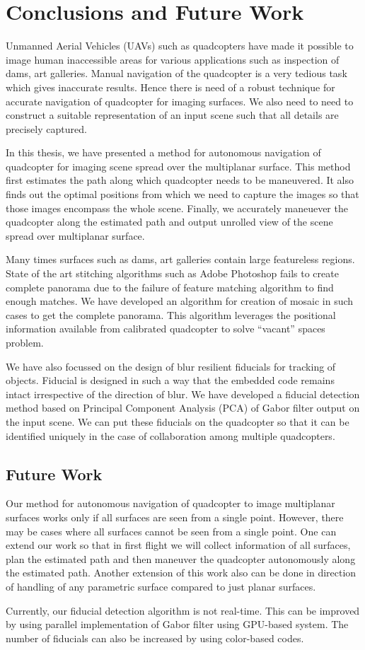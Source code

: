 \chapter{Conclusions and Future Work}
\label{sec:conclusion}
Unmanned Aerial Vehicles (UAVs) such as quadcopters have made it possible to
image human inaccessible areas for various applications such as inspection of
dams, art galleries. Manual navigation of the quadcopter is a very tedious task
which gives inaccurate results. Hence there is need of a robust technique  for
accurate navigation of quadcopter for imaging surfaces. We also need
to need to construct a suitable representation of an input scene such that all
details are precisely captured. 

In this thesis, we have presented a method for autonomous navigation of
quadcopter for imaging scene spread over the multiplanar surface. This method
first estimates the path along which quadcopter needs to be maneuvered. It also
finds out the optimal positions from which we need to capture the images so that
those images encompass the whole scene. Finally, we accurately maneuever the
quadcopter along the estimated path and output unrolled view of the scene spread
over multiplanar surface.

Many times surfaces such as dams, art galleries contain large featureless
regions. State of the art stitching algorithms such as Adobe Photoshop fails to
create complete panorama due to the failure of feature matching algorithm to
find enough matches. We have developed an algorithm for creation of mosaic in such cases to
get the complete panorama. This algorithm leverages the positional information
available from calibrated quadcopter to solve ``vacant'' spaces problem.

We have also focussed on the design of blur resilient fiducials for tracking of
objects. Fiducial is designed in such a way that the embedded code remains
intact irrespective of the direction of blur. We have developed a fiducial
detection method based on Principal Component Analysis (PCA) of Gabor filter
output on the input scene. We can put these fiducials on the quadcopter so that
it can be identified uniquely in the case of collaboration among multiple
quadcopters.

\section{Future Work}
Our method for autonomous navigation of quadcopter to image multiplanar
surfaces works only if all surfaces are seen from a single point. However,
there may be cases where all surfaces cannot be seen from a single point. One
can extend our work so that in first flight we will collect information of all
surfaces, plan the estimated path and then maneuver the quadcopter autonomously
along the estimated path. Another extension of this work also can be done in
direction of handling of any parametric surface compared to just planar
surfaces.

Currently, our fiducial detection algorithm is not real-time. This can be
improved by using parallel implementation of Gabor filter using GPU-based
system. The number of fiducials can also be increased by using color-based
codes.